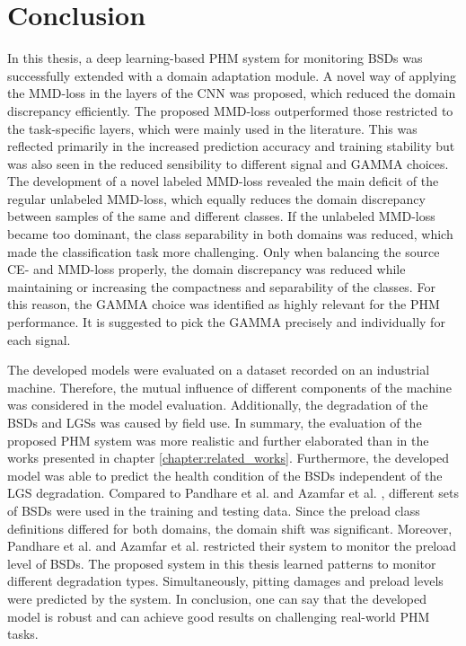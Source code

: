 \chapter{Conclusion}\label{chapter:conclusion}

In this thesis, a deep learning-based PHM system for monitoring BSDs was successfully extended with a domain adaptation module. A novel way of applying the MMD-loss in the layers of the CNN was proposed, which reduced the domain discrepancy efficiently. The proposed MMD-loss outperformed those restricted to the task-specific layers, which were mainly used in the literature. This was reflected primarily in the increased prediction accuracy and training stability but was also seen in the reduced sensibility to different signal and GAMMA choices. The development of a novel labeled MMD-loss revealed the main deficit of the regular unlabeled MMD-loss, which equally reduces the domain discrepancy between samples of the same and different classes. If the unlabeled MMD-loss became too dominant, the class separability in both domains was reduced, which made the classification task more challenging. Only when balancing the source CE- and MMD-loss properly, the domain discrepancy was reduced while maintaining or increasing the compactness and separability of the classes. For this reason, the GAMMA choice was identified as highly relevant for the PHM performance. It is suggested to pick the GAMMA precisely and individually for each signal.

The developed models were evaluated on a dataset recorded on an industrial machine. Therefore, the mutual influence of different components of the machine was considered in the model evaluation. Additionally, the degradation of the BSDs and LGSs was caused by field use. In summary, the evaluation of the proposed PHM system was more realistic and further elaborated than in the works presented in chapter \ref{chapter:related_works}. Furthermore, the developed model was able to predict the health condition of the BSDs independent of the LGS degradation. Compared to Pandhare et al. \cite{Pandhare2021} and Azamfar et al. \cite{AZAMFAR2020103932}, different sets of BSDs were used in the training and testing data. Since the preload class definitions differed for both domains, the domain shift was significant. Moreover, Pandhare et al. \cite{Pandhare2021} and Azamfar et al. \cite{AZAMFAR2020103932} restricted their system to monitor the preload level of BSDs. The proposed system in this thesis learned patterns to monitor different degradation types. Simultaneously, pitting damages and preload levels were predicted by the system. In conclusion, one can say that the developed model is robust and can achieve good results on challenging real-world PHM tasks.